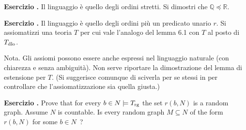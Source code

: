 \documentclass[10pt]{article}
\def\QQ{\mathds Q}
\def\RR{\mathds R}
\newcounter{ex}
\newenvironment{exercise}{\clearpage\addtocounter{ex}{1}\textbf{Esercizio \theex.\quad}}{}
\begin{document}
\clearpage%
\rhead{}\setcounter{ex}{0}


\begin{exercise}
Il linguaggio è quello degli ordini stretti. Si dimostri che $\QQ\preceq\RR$.
\end{exercise}

\begin{exercise}
Il linguaggio è quello degli ordini più un predicato unario $r$. Si assiomatizzi una teoria $T$ per cui vale l'analogo del lemma 6.1 con $T$ al posto di $T_{\rm dlo}$. 

Nota. Gli assiomi possono essere anche espressi nel linguaggio naturale (con chiarezza e senza ambiguità). Non serve riportare la dimostrazione del lemma di estensione per $T$. (Si suggerisce comunque di sciverla per se stessi in per controllare che l'assiomatizzazione sia quella giusta.)
\end{exercise}

\begin{exercise}
Prove that for every $b\in N\models T_{\rm rg}$ the set $r(b,N)$ is a random graph. Assume $N$ is countable. Is every random  graph $M\subseteq N$ of the form $r(b,N)$ for some $b\in N$~?
\end{exercise}
\end{document}
